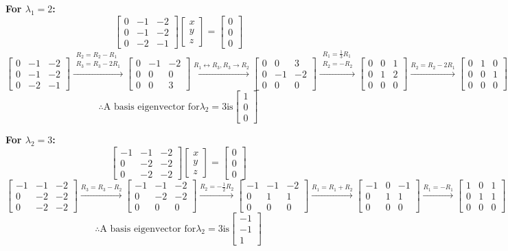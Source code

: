 \documentclass{article}
\newcommand{\mat}[1]{\begin{bmatrix} #1 \end{bmatrix}}
\newcommand{\vect}[1]{\begin{bmatrix} #1 \end{bmatrix}}
\begin{document}
\textbf{For $\lambda_1 = 2$:}
\[
	\mat{ 0 & -1 & -2 \\ 0 & -1 & -2 \\ 0 & -2 & -1 } \vect{x \\ y \\ z} = \vect{0 \\ 0 \\ 0}
\]
\[
	\mat{ 0 & -1 & -2 \\ 0 & -1 & -2 \\ 0 & -2 & -1 }
	\xrightarrow{\substack{R_2 = R_2 - R_1 \\ R_3 = R_3 - 2R_1}}
	\mat{ 0 & -1 & -2 \\ 0 & 0 & 0 \\ 0 & 0 & 3 }
	\xrightarrow{R_1 \leftrightarrow R_3, R_3 \to R_2} %
	\mat{ 0 & 0 & 3 \\ 0 & -1 & -2 \\ 0 & 0 & 0 }
	\xrightarrow{\substack{R_1 = \frac{1}{3}R_1 \\ R_2 = -R_2}}
	\mat{ 0 & 0 & 1 \\ 0 & 1 & 2 \\ 0 & 0 & 0 }
	\xrightarrow{R_2 = R_2 - 2R_1} %
	\mat{ 0 & 1 & 0 \\ 0 & 0 & 1 \\ 0 & 0 & 0 }
\]
\[
	\therefore \text{A basis eigenvector for} \lambda_2 = 3 \text{is}
	\begin{bmatrix}
		1 \\ 0 \\ 0
	\end{bmatrix}
\]


\textbf{For $\lambda_2 = 3$:}
\[
	\mat{ -1 & -1 & -2 \\ 0 & -2 & -2 \\ 0 & -2 & -2 } \vect{x \\ y \\ z} = \vect{0 \\ 0 \\ 0}
\]
\[
	\mat{ -1 & -1 & -2 \\ 0 & -2 & -2 \\ 0 & -2 & -2 }
	\xrightarrow{R_3 = R_3 - R_2}
	\mat{ -1 & -1 & -2 \\ 0 & -2 & -2 \\ 0 & 0 & 0 }
	\xrightarrow{R_2 = -\frac{1}{2}R_2}
	\mat{ -1 & -1 & -2 \\ 0 & 1 & 1 \\ 0 & 0 & 0 }
	\xrightarrow{R_1 = R_1 + R_2}
	\mat{ -1 & 0 & -1 \\ 0 & 1 & 1 \\ 0 & 0 & 0 }
	\xrightarrow{R_1 = -R_1}
	\mat{ 1 & 0 & 1 \\ 0 & 1 & 1 \\ 0 & 0 & 0 }
\]
\[
	\therefore \text{A basis eigenvector for} \lambda_2 = 3 \text{is}
	\begin{bmatrix}
		-1 \\ -1 \\ 1
	\end{bmatrix}
\]
\end{document}
